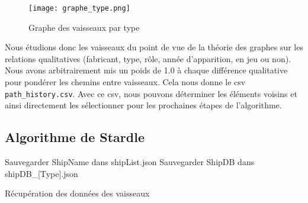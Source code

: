 \documentclass{article}
\begin{document}
\begin{figure}[h]
    \centering
    \texttt{[image: graphe\_type.png]}
    \caption{Graphe des vaisseaux par type}
    \label{fig:graph}
\end{figure}


Nous étudions donc les vaisseaux du point de vue de la théorie des graphes sur les relations qualitatives 
(fabricant, type, rôle, année d'apparition, en jeu ou non).
Nous avons arbitrairement mis un poids de 1.0 à chaque différence qualitative pour pondérer les chemins 
entre vaisseaux. Cela nous donne le csv \verb|path_history.csv|. Avec ce csv, nous pouvons déterminer les éléments 
voisins et ainsi directement les sélectionner pour les prochaines étapes de l'algorithme.

\subsection{Algorithme de Stardle}
\begin{algorithm}[H]
\SetAlgoLined
{}

\;
\;
Sauvegarder ShipName dans shipList.json\;
Sauvegarder ShipDB dans shipDB\_[Type].json\;
\caption{Récupération des données des vaisseaux}
\end{algorithm}
\end{document}
